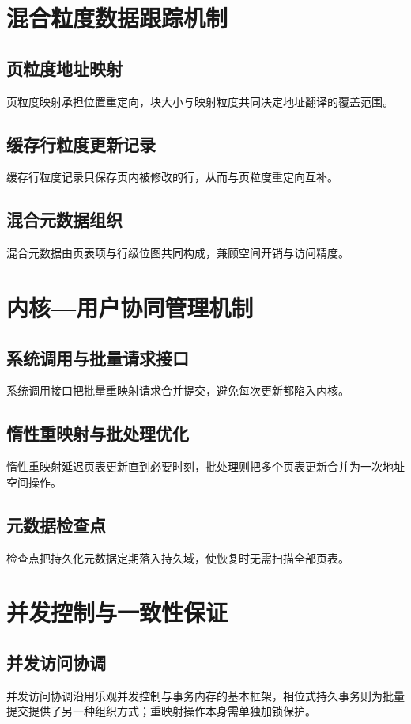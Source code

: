 \section{混合粒度数据跟踪机制}
\subsection{页粒度地址映射}
页粒度映射承担位置重定向，块大小与映射粒度共同决定地址翻译的覆盖范围\cite{kadekodiWinefs2021}。
\subsection{缓存行粒度更新记录}
缓存行粒度记录只保存页内被修改的行，从而与页粒度重定向互补\cite{niSsp2019,bhattacharyyaNvmr2022}。
\subsection{混合元数据组织}
混合元数据由页表项与行级位图共同构成，兼顾空间开销与访问精度\cite{caiHoop2020,niSsp2019}。

\section{内核—用户协同管理机制}
\subsection{系统调用与批量请求接口}
系统调用接口把批量重映射请求合并提交，避免每次更新都陷入内核\cite{mathurNew2007,marmolLibpm2018}。
\subsection{惰性重映射与批处理优化}
惰性重映射延迟页表更新直到必要时刻，批处理则把多个页表更新合并为一次地址空间操作\cite{marmolLibpm2018,liCtfs2022}。
\subsection{元数据检查点}
检查点把持久化元数据定期落入持久域，使恢复时无需扫描全部页表\cite{correiaRomulus2018,assaTl4x2023}。

\section{并发控制与一致性保证}
\subsection{并发访问协调}
并发访问协调沿用乐观并发控制与事务内存的基本框架\cite{kungOn1981,herlihyTransactional1993}，相位式持久事务则为批量提交提供了另一种组织方式\cite{baldassinNvphtm2020}；重映射操作本身需单独加锁保护\cite{chakrabartiAtlas2014}。
